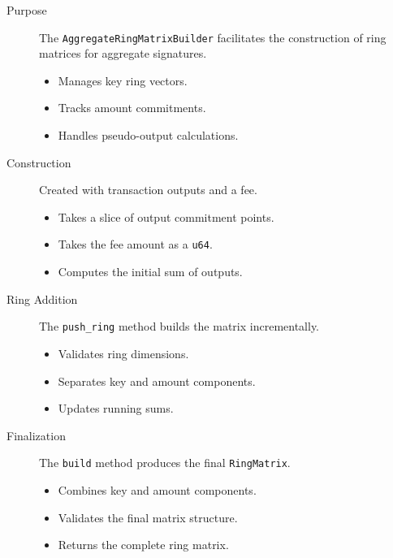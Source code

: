 \begin{description}
\item[Purpose] \hfill

The \texttt{AggregateRingMatrixBuilder} facilitates the construction of ring matrices for aggregate signatures.  
\begin{itemize}
\item Manages key ring vectors.  
\item Tracks amount commitments.  
\item Handles pseudo-output calculations.  
\end{itemize}

\item[Construction] \hfill 

Created with transaction outputs and a fee. %
\begin{itemize}
\item Takes a slice of output commitment points.  
\item Takes the fee amount as a \texttt{u64}.  
\item Computes the initial sum of outputs. %
\end{itemize}

\item[Ring Addition] \hfill 

The \texttt{push\_ring} method builds the matrix incrementally. %
\begin{itemize}
\item Validates ring dimensions.  
\item Separates key and amount components.  
\item Updates running sums.  
\end{itemize}

\item[Finalization] \hfill 

The \texttt{build} method produces the final \texttt{RingMatrix}. %
\begin{itemize}
\item Combines key and amount components.  
\item Validates the final matrix structure.  
\item Returns the complete ring matrix.  
\end{itemize}
\end{description}

